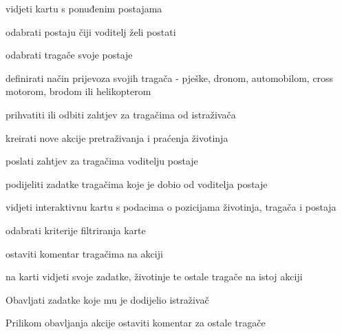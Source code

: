 			
			\begin{packed_enum}
				\item  {}
				
				\begin{packed_enum}
					
					\item vidjeti kartu s ponuđenim postajama
					\item odabrati postaju čiji voditelj želi postati
					\item odabrati tragače svoje postaje
					\item definirati način prijevoza svojih tragača - pješke, dronom, automobilom, cross motorom, brodom ili helikopterom
					\item prihvatiti ili odbiti zahtjev za tragačima od istraživača
					
				\end{packed_enum}
			
				\item  {}
				
				\begin{packed_enum}
					
					\item kreirati nove akcije pretraživanja i praćenja životinja
					\item poslati zahtjev za tragačima voditelju postaje
					\item podijeliti zadatke tragačima koje je dobio od voditelja postaje
					\item vidjeti interaktivnu kartu s podacima o pozicijama životinja, tragača i postaja
					\item odabrati kriterije filtriranja karte
					\item ostaviti komentar tragačima na akciji
					
				\end{packed_enum}
			
				\vspace{36pt}
				
				\item  {}
				
				\begin{packed_enum}
					
					\item na karti vidjeti svoje zadatke, životinje te ostale tragače na istoj akciji
					\item Obavljati zadatke koje mu je dodijelio istraživač
					\item Prilikom obavljanja akcije ostaviti komentar za ostale tragače
					

\end{packed_enum}
\end{packed_enum}
